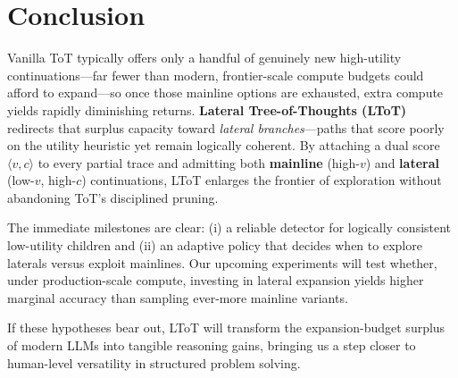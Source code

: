 \documentclass[onecolumn]{IEEEtran}
\begin{document}
\section{Conclusion}
\label{section:conclusion}

Vanilla ToT typically offers only a handful of genuinely new high-utility continuations---far fewer than modern, frontier-scale compute budgets could afford to expand---so once those mainline options are exhausted, extra compute yields rapidly diminishing returns.
\textbf{Lateral Tree-of-Thoughts (LToT)} redirects that surplus capacity toward \textit{lateral branches}---paths that score poorly on the utility heuristic yet remain logically coherent.
By attaching a dual score $\langle v, c\rangle$ to every partial trace and admitting both \textbf{mainline} (high-$v$) and \textbf{lateral} (low-$v$, high-$c$) continuations, LToT enlarges the frontier of exploration without abandoning ToT's disciplined pruning.

The immediate milestones are clear: (i) a reliable detector for logically consistent low-utility children and (ii) an adaptive policy that decides when to explore laterals versus exploit mainlines.
Our upcoming experiments will test whether, under production-scale compute, investing in lateral expansion yields higher marginal accuracy than sampling ever-more mainline variants.

If these hypotheses bear out, LToT will transform the expansion-budget surplus of modern LLMs into tangible reasoning gains, bringing us a step closer to human-level versatility in structured problem solving.

\printbibliography
\end{document}

